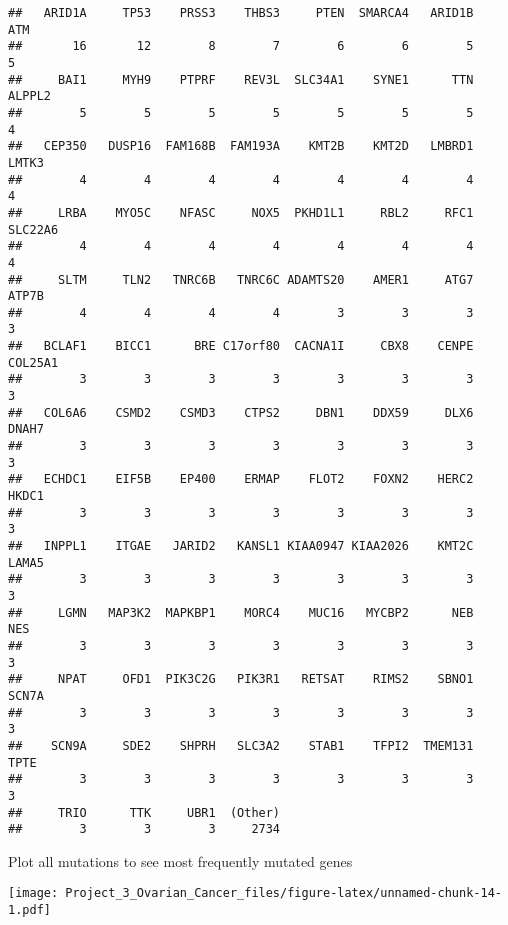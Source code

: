 \documentclass[]{article}
\newenvironment{Shaded}{\begin{snugshade}}{\end{snugshade}}
\newcommand{\KeywordTok}[1]{\textcolor[rgb]{0.13,0.29,0.53}{\textbf{#1}}}
\newcommand{\NormalTok}[1]{#1}
\newcommand{\OperatorTok}[1]{\textcolor[rgb]{0.81,0.36,0.00}{\textbf{#1}}}
\begin{document}
\begin{verbatim}
##   ARID1A     TP53    PRSS3    THBS3     PTEN  SMARCA4   ARID1B      ATM 
##       16       12        8        7        6        6        5        5 
##     BAI1     MYH9    PTPRF    REV3L  SLC34A1    SYNE1      TTN   ALPPL2 
##        5        5        5        5        5        5        5        4 
##   CEP350   DUSP16  FAM168B  FAM193A    KMT2B    KMT2D   LMBRD1    LMTK3 
##        4        4        4        4        4        4        4        4 
##     LRBA    MYO5C    NFASC     NOX5  PKHD1L1     RBL2     RFC1  SLC22A6 
##        4        4        4        4        4        4        4        4 
##     SLTM     TLN2   TNRC6B   TNRC6C ADAMTS20    AMER1     ATG7    ATP7B 
##        4        4        4        4        3        3        3        3 
##   BCLAF1    BICC1      BRE C17orf80  CACNA1I     CBX8    CENPE  COL25A1 
##        3        3        3        3        3        3        3        3 
##   COL6A6    CSMD2    CSMD3    CTPS2     DBN1    DDX59     DLX6    DNAH7 
##        3        3        3        3        3        3        3        3 
##   ECHDC1    EIF5B    EP400    ERMAP    FLOT2    FOXN2    HERC2    HKDC1 
##        3        3        3        3        3        3        3        3 
##   INPPL1    ITGAE   JARID2   KANSL1 KIAA0947 KIAA2026    KMT2C    LAMA5 
##        3        3        3        3        3        3        3        3 
##     LGMN   MAP3K2  MAPKBP1    MORC4    MUC16   MYCBP2      NEB      NES 
##        3        3        3        3        3        3        3        3 
##     NPAT     OFD1  PIK3C2G   PIK3R1   RETSAT    RIMS2    SBNO1    SCN7A 
##        3        3        3        3        3        3        3        3 
##    SCN9A     SDE2    SHPRH   SLC3A2    STAB1    TFPI2  TMEM131     TPTE 
##        3        3        3        3        3        3        3        3 
##     TRIO      TTK     UBR1  (Other) 
##        3        3        3     2734
\end{verbatim}

Plot all mutations to see most frequently mutated genes

\begin{Shaded}
\end{Shaded}

\texttt{[image: Project\_3\_Ovarian\_Cancer\_files/figure-latex/unnamed-chunk-14-1.pdf]}
\end{document}
